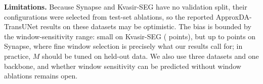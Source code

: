 \textbf{Limitations.} Because Synapse and Kvasir-SEG have no validation split, their configurations were selected from test-set ablations, so the reported ApproxDA-TransUNet results on these datasets may be optimistic. The bias is bounded by the window-sensitivity range: small on Kvasir-SEG ( points), but up to  points on Synapse, where fine window selection is precisely what our results call for; in practice, $M$ should be tuned on held-out data. We also use three datasets and one backbone, and whether window sensitivity can be predicted without window ablations remains open.
